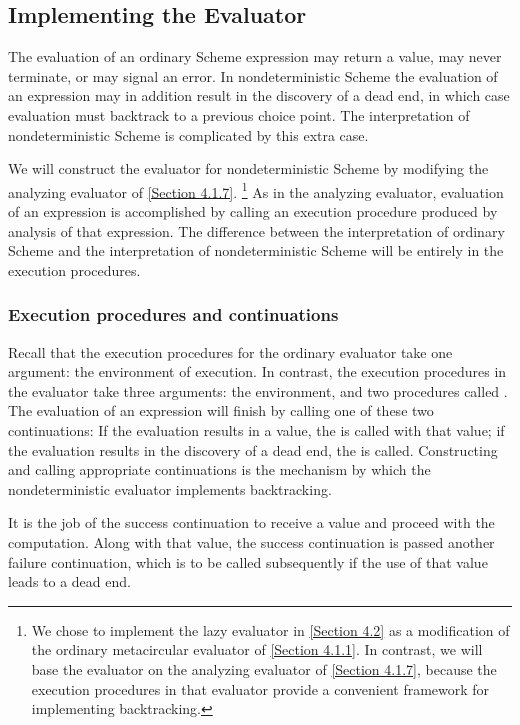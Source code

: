 \subsection{Implementing the  Evaluator}
\label{Section 4.3.3}

The evaluation of an ordinary Scheme expression may return a value, may never terminate, or may signal an error.
In nondeterministic Scheme the evaluation of an expression may in addition result in the discovery of a dead end, in which case evaluation must backtrack to a previous choice point.
The interpretation of nondeterministic Scheme is complicated by this extra case.

We will construct the  evaluator for nondeterministic Scheme by modifying the analyzing evaluator of \cref{Section 4.1.7}.%
\footnote{
	We chose to implement the lazy evaluator in \cref{Section 4.2} as a modification of the ordinary metacircular evaluator of \cref{Section 4.1.1}.
	In contrast, we will base the  evaluator on the analyzing evaluator of \cref{Section 4.1.7}, because the execution procedures in that evaluator provide a convenient framework for implementing backtracking.
}
	As in the analyzing evaluator, evaluation of an expression is accomplished by calling an execution procedure produced by analysis of that expression.
	The difference between the interpretation of ordinary Scheme and the interpretation of nondeterministic Scheme will be entirely in the execution procedures.



\subsubsection*{Execution procedures and continuations}

Recall that the execution procedures for the ordinary evaluator take one argument:
the environment of execution.
In contrast, the execution procedures in the  evaluator take three arguments:
the environment, and two procedures called .
The evaluation of an expression will finish by calling one of these two continuations:
If the evaluation results in a value, the  is called with that value;
if the evaluation results in the discovery of a dead end, the  is called.
Constructing and calling appropriate continuations is the mechanism by which the nondeterministic evaluator implements backtracking.

It is the job of the success continuation to receive a value and proceed with the computation.
Along with that value, the success continuation is passed another failure continuation, which is to be called subsequently if the use of that value leads to a dead end.

